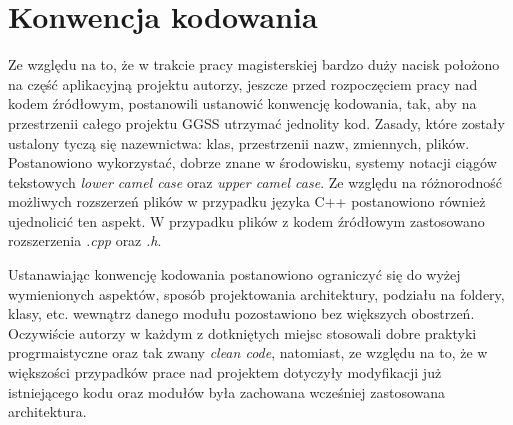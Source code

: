 \section{Konwencja kodowania}
Ze względu na to, że w trakcie pracy magisterskiej bardzo duży nacisk położono na część aplikacyjną projektu autorzy, jeszcze przed rozpoczęciem pracy nad kodem źródłowym, postanowili ustanowić konwencję kodowania, tak, aby na przestrzenii całego projektu GGSS utrzymać jednolity kod. Zasady, które zostały ustalony tyczą się nazewnictwa: klas, przestrzenii nazw, zmiennych, plików. Postanowiono wykorzystać, dobrze znane w środowisku, systemy notacji ciągów tekstowych \emph{lower camel case} oraz \emph{upper camel case}. Ze względu na różnorodność możliwych rozszerzeń plików w przypadku języka C++ postanowiono również ujednolicić ten aspekt. W przypadku plików z kodem źródłowym zastosowano rozszerzenia \emph{.cpp} oraz \emph{.h}. %

Ustanawiając konwencję kodowania postanowiono ograniczyć się do wyżej wymienionych aspektów, sposób projektowania architektury, podziału na foldery, klasy, etc. wewnątrz danego modułu pozostawiono bez większych obostrzeń. Oczywiście autorzy w każdym z dotkniętych miejsc stosowali dobre praktyki progrmaistyczne oraz tak zwany \emph{clean code}, natomiast, ze względu na to, że w większości przypadków prace nad projektem dotyczyły modyfikacji już istniejącego kodu oraz modułów była zachowana wcześniej zastosowana architektura.


